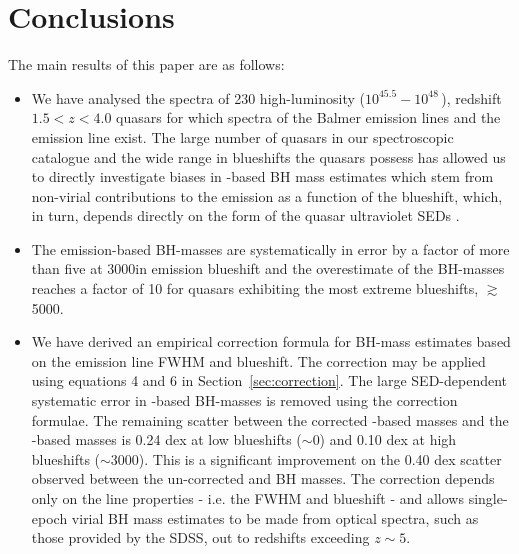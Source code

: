 \section{Conclusions}
\label{sec:conclusions}

The main results of this paper are as follows: 

\begin{itemize}
\item We have analysed the spectra of 230 high-luminosity ($10^{45.5}-10^{48}$\,\ergs), redshift $1.5 < z < 4.0$ quasars for which spectra of the Balmer emission lines and the  emission line exist.
The large number of quasars in our spectroscopic catalogue and the wide range in  blueshifts the quasars possess has allowed us to directly investigate biases in -based BH mass estimates which stem from non-virial contributions to the  emission as a function of the  blueshift, which, in turn, depends directly on the form of the quasar ultraviolet SEDs \citep{richards11}.
\item The  emission-based BH-masses are systematically in error by a factor of more than five at 3000\kms in  emission blueshift and the overestimate of the BH-masses reaches a factor of 10 for quasars exhibiting the most extreme blueshifts, $\gtrsim$5000\kms. 
\item We have derived an empirical correction formula for BH-mass estimates based on the  emission line FWHM and blueshift.
The correction may be applied using equations 4 and 6 in Section~\ref{sec:correction}.
The large SED-dependent systematic error in -based BH-masses is removed using the correction formulae.
The remaining scatter between the corrected -based masses and the \hans-based masses is 0.24 dex at low  blueshifts ($\sim$0\kms) and 0.10 dex at high blueshifts ($\sim$3000\kms). 
This is a significant improvement on the 0.40 dex scatter observed between the un-corrected  and \ha BH masses. 
The correction depends only on the  line properties - i.e. the FWHM and blueshift - and allows single-epoch virial BH mass estimates to be made from optical spectra, such as those provided by the SDSS, out to redshifts exceeding $z\sim 5$. 
\end{itemize}

